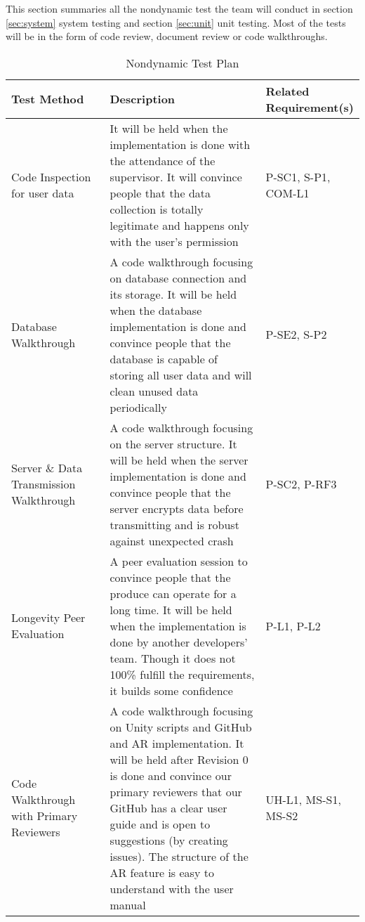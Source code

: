 \documentclass[12pt, titlepage]{article}
\begin{document}
This section summaries all the nondynamic test the team will conduct in section \ref{sec:system} system testing and section \ref{sec:unit} unit testing. Most of the tests will be in the form of code review,  document review or code walkthroughs.
\begin{table}[H]
\caption{Nondynamic Test Plan}
\begin{tabular}{|p{0.3\linewidth} | p{0.5\linewidth}| p{0.2\linewidth} |}
\hline
\multicolumn{1}{|l}{\bfseries Test Method} & \multicolumn{1}{|l|}{\bfseries Description} & \multicolumn{1}{l|}{\bfseries Related Requirement(s)}\\
\hline
Code Inspection for user data & It will be held when the implementation is done with the attendance of the supervisor. It will convince people that the data collection is totally legitimate and happens only with the user's permission & P-SC1, S-P1, COM-L1 \\
\hline
Database Walkthrough & A code walkthrough focusing on database connection and its storage. It will be held when the database implementation is done and convince people that the database is capable of storing all user data and will clean unused data periodically & P-SE2, S-P2\\
\hline
Server \& Data Transmission Walkthrough & A code walkthrough focusing on the server structure. It will be held when the server implementation is done and convince people that the server encrypts data before transmitting and is robust against unexpected crash & P-SC2, P-RF3 \\
\hline
Longevity Peer Evaluation & A peer evaluation session to convince people that the produce can operate for a long time. It will be held when the implementation is done by another developers' team. Though it does not 100\% fulfill the requirements, it builds some confidence & P-L1, P-L2\\
\hline
Code Walkthrough with Primary Reviewers & A code walkthrough focusing on Unity scripts and GitHub and AR implementation. It will be held after Revision 0 is done and convince our primary reviewers that our GitHub has a clear user guide and is open to suggestions (by creating issues). The structure of the AR feature is easy to understand with the user manual & UH-L1, MS-S1, MS-S2\\
\hline
\end{tabular}
\end{table}
\end{document}

